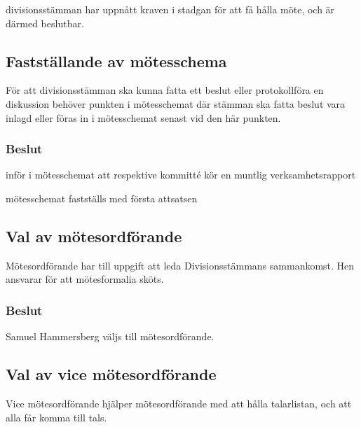 \documentclass[protokoll]{dvd}
\begin{document}
\begin{attsatser}
    \item divisionsstämman har uppnått kraven i stadgan för att få hålla möte, och är därmed beslutbar.
\end{attsatser}

\subsection{Fastställande av mötesschema}

För att divisionsstämman ska kunna fatta ett beslut eller protokollföra en diskussion behöver punkten i mötesschemat där stämman ska fatta beslut vara inlagd eller föras in i mötesschemat senast vid den här punkten.

\subsubsection*{Beslut}

\begin{attsatser}
    \item inför i mötesschemat att respektive kommitté kör en muntlig verksamhetsrapport
    \item mötesschemat fastställs med första attsatsen
\end{attsatser}


\subsection{Val av mötesordförande}

Mötesordförande har till uppgift att leda Divisionsstämmans sammankomst.
Hen ansvarar för att mötesformalia sköts.

\subsubsection*{Beslut}

\begin{attsatser}
    \item Samuel Hammersberg väljs till mötesordförande.
\end{attsatser}


\subsection{Val av vice mötesordförande}

Vice mötesordförande hjälper mötesordförande med att hålla talarlistan, och att alla får komma till tals.
\end{document}
